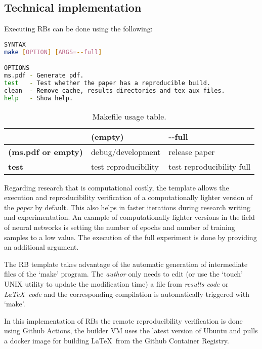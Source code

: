 \documentclass[journal]{IEEEtran}
\begin{document}
\subsection{Technical implementation}
Executing RBs can be done using the following:
\begin{lstlisting}[language=Bash, style=lststyle, caption={Makefile call syntax from the shell.}, captionpos=b]
SYNTAX
make [OPTION] [ARGS=--full]

OPTIONS
ms.pdf - Generate pdf.
test   - Test whether the paper has a reproducible build.
clean  - Remove cache, results directories and tex aux files.
help   - Show help.

\end{lstlisting}

\begin{table}[]
	\centering
	\caption{Makefile usage table.}
	\label{table:usagetable}
	\begin{tabular}{l|l|l}
		\toprule
		\diagbox{\textbf{OPTION}}{\textbf{ARGS}} & \textbf{(empty)}              & \textbf{-{}-full}                    \\
		\midrule
		\textbf{(ms.pdf or empty)}          & debug/development    & release paper             \\
		\midrule
		\textbf{test}                       & test reproducibility & test reproducibility full \\
		\bottomrule
	\end{tabular}
\end{table}

Regarding research that is computational costly, the template allows the execution and reproducibility verification of a computationally lighter version of the \textit{paper} by default.
This also helps in faster iterations during research writing and experimentation.
An example of computationally lighter versions in the field of neural networks is setting the number of epochs and number of training samples to a low value.
The execution of the full experiment is done by providing an additional argument.

The RB template takes advantage of the automatic generation of intermediate files of the `make' program.
The \textit{author} only needs to edit (or use the `touch' UNIX utility to update the modification time) a file from \textit{results code} or \textit{\LaTeX\ code} and the corresponding compilation is automatically triggered with `make'.

In this implementation of RBs the remote reproducibility verification is done using Github Actions, the builder VM uses the latest version of Ubuntu and pulls a docker image for building \LaTeX\ from the Github Container Registry.
\end{document}
